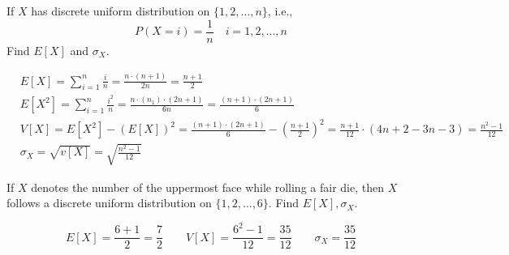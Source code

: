 \begin{example}
    If $X$ has discrete uniform distribution on $\lbrace 1, 2, \dots, n
\rbrace$, i.e., 
    \begin{equation*}
        P(X = i) = \frac{1}{n} \quad i = 1, 2, \dots, n
    \end{equation*}
    Find $E[X]$ and $\sigma_X$.
\end{example}
\begin{solution}
    \begin{align*}
        & E[X] = \sum_{i = 1}^n \frac{i}{n} 
               = \frac{n \cdot (n+1)}{2n} 
               = \frac{n+1}{2}                                               \\
        & E[X^2] = \sum_{i = 1}^n \frac{i^2}{n}
                 = \frac{n \cdot (n_1) \cdot (2n+1)}{6n}
                 = \frac{(n+1) \cdot (2n+1)}{6}                              \\
        & V[X] = E[X^2] - (E[X])^2
               = \frac{(n+1) \cdot (2n+1)}{6} - (\frac{n+1}{2})^2
               = \frac{n+1}{12} \cdot (4n + 2 - 3n -3)
               = \frac{n^2 - 1}{12}                                          \\
        & \sigma_X = \sqrt{v[X]} = \sqrt{\frac{n^2 - 1}{12}}
    \end{align*}
\end{solution}

\begin{example}
    If $X$ denotes the number of the uppermost face while rolling a fair die,
then $X$ follows a discrete uniform distribution on $\lbrace 1, 2,
\dots, 6 \rbrace$. Find $E[X], \sigma_X$.
\end{example}
\begin{solution}
    \begin{equation*}
        E[X] = \frac{6 + 1}{2} = \frac{7}{2} \qquad
        V[X] = \frac{6^2 - 1}{12} = \frac{35}{12} \qquad
        \sigma_X = \frac{35}{12}
    \end{equation*}
\end{solution}